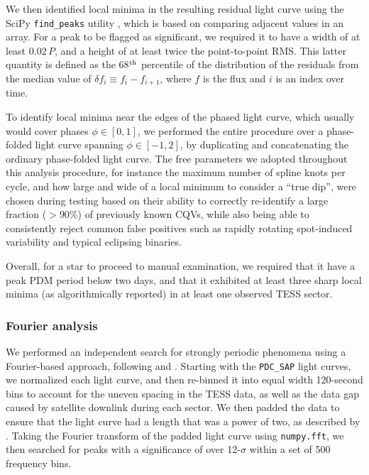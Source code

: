 \documentclass[11pt,twocolumn,tighten]{aastex63}
\begin{document}
We then identified local minima in the resulting residual light curve
using the SciPy \texttt{find\_peaks} utility
\citep{2020NatMe..17..261V}, which is based on comparing adjacent
values in an array.  For a peak to be flagged as significant, we
required it to have a width of at least $0.02\,P$, and a height of at
least twice the point-to-point RMS.  This latter quantity is defined
as the 68$^{\rm th}$ percentile of the distribution of the residuals
from the median value of $\delta f_i \equiv f_i - f_{i+1}$, where $f$
is the flux and $i$ is an index over time.

To identify local minima near the edges of the phased light curve,
which usually would cover phases $\phi \in [ 0,1 ]$, we performed the
entire procedure over a phase-folded light curve spanning $\phi \in
[-1,2 ]$, by duplicating and concatenating the ordinary phase-folded
light curve.  The free parameters we adopted throughout this analysis
procedure, for instance the maximum number of spline knots per cycle,
and how large and wide of a local minimum to consider a ``true dip'',
were chosen during testing based on their ability to correctly
re-identify a large fraction ($>$90\%) of previously known CQVs, while also being
able to consistently reject common false positives such as rapidly
rotating spot-induced variability and typical eclipsing binaries.

Overall, for a star to proceed to manual examination, we required that
it have a peak PDM period below two days, and that it exhibited at
least three sharp local minima (as algorithmically reported) in at
least one observed TESS sector.



\subsubsection{Fourier analysis}
\label{subsec:fourier}

We performed an independent search for strongly periodic phenomena
using a Fourier-based approach, following \citet{2019ApJ...876..127Z}
and \citet[][their Section~1.3]{2023MNRAS.524.4220P}.  Starting with
the {\tt PDC\_SAP} light curves, we normalized each light curve, and
then re-binned it into equal width 120-second bins to account for the
uneven spacing in the TESS data, as well as the data gap caused by
satellite downlink during each sector.  We then padded the data to
ensure that the light curve had a length that was a power of two, as
described by \citeauthor{2019ApJ...876..127Z}.  Taking the Fourier
transform of the padded light curve using {\tt numpy.fft},
we then searched for peaks with a significance of over 12-$\sigma$
within a set of 500 frequency bins. 
\end{document}
